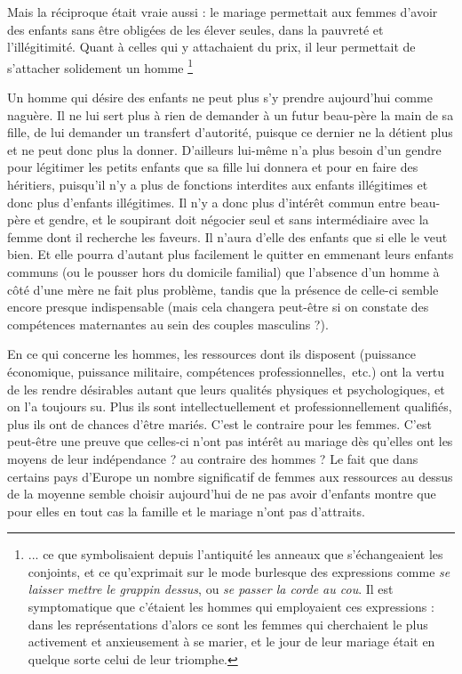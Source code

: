 Mais la réciproque était vraie aussi : le mariage permettait aux femmes d'avoir des enfants sans être obligées de les élever seules, dans la pauvreté et l'illégitimité. Quant à celles qui y attachaient du prix, il leur permettait de s'attacher solidement un homme%
\footnote{... ce que symbolisaient depuis l'antiquité les anneaux que s'échangeaient les conjoints, et ce qu'exprimait sur le mode burlesque des expressions comme {\emph{se laisser mettre le grappin dessus}}, ou {\emph{se passer la corde au cou}}. Il est symptomatique que c'étaient les hommes qui employaient ces expressions : dans les représentations d'alors ce sont les femmes qui cherchaient le plus activement et anxieusement à se marier, et le jour de leur mariage était en quelque sorte celui de leur triomphe.}
 
 Un homme qui désire des enfants ne peut plus s'y prendre aujourd'hui comme naguère. Il ne lui sert plus à rien de demander à un futur beau-père la main de sa fille, de lui demander un transfert d'autorité, puisque ce dernier ne la détient plus et ne peut donc plus la donner. D'ailleurs lui-même n'a plus besoin d'un gendre pour légitimer les petits enfants que sa fille lui donnera et pour en faire des héritiers, puisqu'il n'y a plus de fonctions interdites aux enfants illégitimes et donc plus d'enfants illégitimes. Il n'y a donc plus d'intérêt commun entre beau-père et gendre, et le soupirant doit négocier seul et sans intermédiaire avec la femme dont il recherche les faveurs. Il n'aura d'elle des enfants que si elle le veut bien. Et elle pourra d'autant plus facilement le quitter en emmenant leurs enfants communs (ou le pousser hors du domicile familial) que l'absence d'un homme à côté d'une mère ne fait plus problème, tandis que la présence de celle-ci semble encore presque indispensable (mais cela changera peut-être si on constate des compétences maternantes au sein des couples masculins ?). 
 
 En ce qui concerne les hommes, les ressources dont ils disposent (puissance économique, puissance militaire, compétences professionnelles,~etc.) ont la vertu de les rendre désirables autant que leurs qualités physiques et psychologiques, et on l'a toujours su. Plus ils sont intellectuellement et professionnellement qualifiés, plus ils ont de chances d'être mariés. C'est le contraire pour les femmes. C'est peut-être une preuve que celles-ci n'ont pas intérêt au mariage dès qu'elles ont les moyens de leur indépendance ? au contraire des hommes ? Le fait que dans certains pays d'Europe un nombre significatif de femmes aux ressources au dessus de la moyenne semble choisir aujourd'hui de ne pas avoir d'enfants montre que pour elles en tout cas la famille et le mariage n'ont pas d'attraits. 
 
